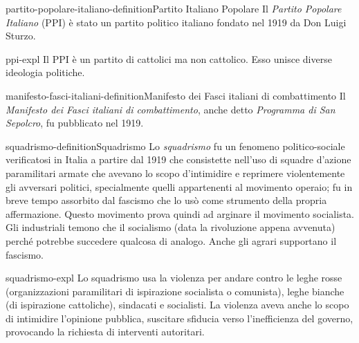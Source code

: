 \documentclass[preview]{standalone}
\begin{document}
\begin{snippetdefinition}{partito-popolare-italiano-definition}{Partito Italiano Popolare}
    Il \textit{Partito Popolare Italiano} (PPI) è stato un partito politico italiano
    fondato nel 1919 da Don Luigi Sturzo. 
\end{snippetdefinition}

\begin{snippet}{ppi-expl}
    Il PPI è un partito di cattolici ma non cattolico.
    Esso unisce diverse ideologia politiche.
\end{snippet}



\begin{snippetdefinition}{manifesto-fasci-italiani-definition}{Manifesto dei Fasci italiani di combattimento}
    Il \textit{Manifesto dei Fasci italiani di combattimento},
    anche detto \textit{Programma di San Sepolcro},
    fu pubblicato nel 1919.
\end{snippetdefinition}

\begin{snippetdefinition}{squadrismo-definition}{Squadrismo}
    Lo \textit{squadrismo} fu un fenomeno politico-sociale verificatosi in Italia
    a partire dal 1919 che consistette nell'uso di squadre d'azione paramilitari armate
    che avevano lo scopo d'intimidire e reprimere violentemente gli
    avversari politici, specialmente quelli appartenenti al movimento
    operaio; fu in breve tempo assorbito dal fascismo che lo usò come
    strumento della propria affermazione.
    Questo movimento prova quindi ad arginare il movimento socialista.
    Gli industriali temono che il socialismo (data la rivoluzione appena avvenuta)
    perché potrebbe succedere qualcosa di analogo.
    Anche gli agrari supportano il fascismo.
\end{snippetdefinition}

\begin{snippet}{squadrismo-expl}
    Lo squadrismo usa la violenza per andare contro le leghe rosse
    (organizzazioni paramilitari di ispirazione socialista o comunista),
    leghe bianche (di ispirazione cattoliche), sindacati e socialisti.
    La violenza aveva anche lo scopo di intimidire l'opinione pubblica, suscitare
    sfiducia verso l'inefficienza del governo, provocando la richiesta di interventi autoritari.
\end{snippet}
\end{document}
